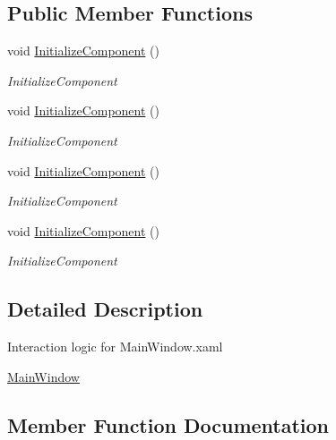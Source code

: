 \subsection*{Public Member Functions}
\begin{DoxyCompactItemize}
\item 
void \hyperlink{class_accumulator_monitor_m017_1_1_u_i_1_1_main_window_ac226f7741a652d22dc88ede4fe477a7c}{Initialize\+Component} ()
\begin{DoxyCompactList}\small\item\em Initialize\+Component \end{DoxyCompactList}\item 
void \hyperlink{class_accumulator_monitor_m017_1_1_u_i_1_1_main_window_ac226f7741a652d22dc88ede4fe477a7c}{Initialize\+Component} ()
\begin{DoxyCompactList}\small\item\em Initialize\+Component \end{DoxyCompactList}\item 
void \hyperlink{class_accumulator_monitor_m017_1_1_u_i_1_1_main_window_ac226f7741a652d22dc88ede4fe477a7c}{Initialize\+Component} ()
\begin{DoxyCompactList}\small\item\em Initialize\+Component \end{DoxyCompactList}\item 
void \hyperlink{class_accumulator_monitor_m017_1_1_u_i_1_1_main_window_ac226f7741a652d22dc88ede4fe477a7c}{Initialize\+Component} ()
\begin{DoxyCompactList}\small\item\em Initialize\+Component \end{DoxyCompactList}\end{DoxyCompactItemize}


\subsection{Detailed Description}
Interaction logic for Main\+Window.\+xaml 

\hyperlink{class_accumulator_monitor_m017_1_1_u_i_1_1_main_window}{Main\+Window} 

\subsection{Member Function Documentation}
\mbox{\label{class_accumulator_monitor_m017_1_1_u_i_1_1_main_window_ac226f7741a652d22dc88ede4fe477a7c}} 
